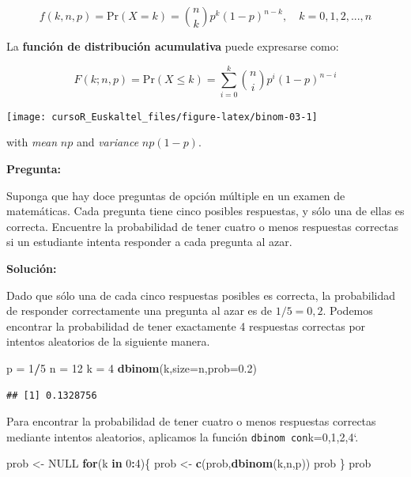 \documentclass[]{book}
\newenvironment{Shaded}{\begin{snugshade}}{\end{snugshade}}
\newcommand{\KeywordTok}[1]{\textcolor[rgb]{0.13,0.29,0.53}{\textbf{#1}}}
\newcommand{\DataTypeTok}[1]{\textcolor[rgb]{0.13,0.29,0.53}{#1}}
\newcommand{\DecValTok}[1]{\textcolor[rgb]{0.00,0.00,0.81}{#1}}
\newcommand{\FloatTok}[1]{\textcolor[rgb]{0.00,0.00,0.81}{#1}}
\newcommand{\StringTok}[1]{\textcolor[rgb]{0.31,0.60,0.02}{#1}}
\newcommand{\OtherTok}[1]{\textcolor[rgb]{0.56,0.35,0.01}{#1}}
\newcommand{\ControlFlowTok}[1]{\textcolor[rgb]{0.13,0.29,0.53}{\textbf{#1}}}
\newcommand{\OperatorTok}[1]{\textcolor[rgb]{0.81,0.36,0.00}{\textbf{#1}}}
\newcommand{\NormalTok}[1]{#1}
\begin{document}
\[
{
f(k,n,p) = \mbox{Pr}(X=k)=\binom{n}{k} p^k (1-p)^{n-k}, \quad k=0,1,2,...,n
}
\]

La \textbf{función de distribución acumulativa} puede expresarse como:

\[
{
F(k;n,p) = \mbox{Pr}(X\leq k) = \sum_{i=0}^{k}\binom{n}{i} p^i (1-p)^{n-i}
}
\]

\begin{center}\texttt{[image: cursoR\_Euskaltel\_files/figure-latex/binom-03-1]} \end{center}

with \emph{mean} \(np\) and \emph{variance} \(np(1-p)\).

\textbf{Pregunta:}

Suponga que hay doce preguntas de opción múltiple en un examen de
matemáticas. Cada pregunta tiene cinco posibles respuestas, y sólo una
de ellas es correcta. Encuentre la probabilidad de tener cuatro o menos
respuestas correctas si un estudiante intenta responder a cada pregunta
al azar.

\textbf{Solución:}

Dado que sólo una de cada cinco respuestas posibles es correcta, la
probabilidad de responder correctamente una pregunta al azar es de
\(1/5=0,2\). Podemos encontrar la probabilidad de tener exactamente 4
respuestas correctas por intentos aleatorios de la siguiente manera.

\begin{Shaded}
\begin{Highlighting}[]
\NormalTok{p =}\StringTok{ }\DecValTok{1}\OperatorTok{/}\DecValTok{5}
\NormalTok{n =}\StringTok{ }\DecValTok{12}
\NormalTok{k =}\StringTok{ }\DecValTok{4}
\KeywordTok{dbinom}\NormalTok{(k,}\DataTypeTok{size=}\NormalTok{n,}\DataTypeTok{prob=}\FloatTok{0.2}\NormalTok{)}
\end{Highlighting}
\end{Shaded}

\begin{verbatim}
## [1] 0.1328756
\end{verbatim}

Para encontrar la probabilidad de tener cuatro o menos respuestas
correctas mediante intentos aleatorios, aplicamos la función
\texttt{dbinom\textquotesingle{}\ con}k=0,1,2,4`.

\begin{Shaded}
\begin{Highlighting}[]
\NormalTok{prob <-}\StringTok{ }\OtherTok{NULL}
\ControlFlowTok{for}\NormalTok{(k }\ControlFlowTok{in} \DecValTok{0}\OperatorTok{:}\DecValTok{4}\NormalTok{)\{}
\NormalTok{prob <-}\StringTok{ }\KeywordTok{c}\NormalTok{(prob,}\KeywordTok{dbinom}\NormalTok{(k,n,p))}
\NormalTok{prob}
\NormalTok{\}}
\NormalTok{prob}
\end{Highlighting}
\end{Shaded}
\end{document}

